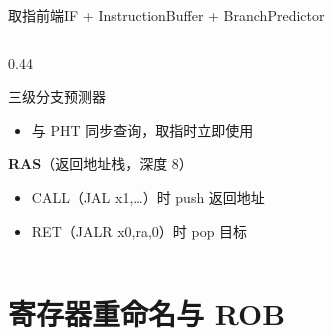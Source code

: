 \documentclass[aspectratio=169,xcolor={dvipsnames,svgnames},10pt]{beamer}
\begin{document}
\begin{frame}{取指前端}{IF + InstructionBuffer + BranchPredictor}
\begin{columns}[T]
\begin{column}{0.44\textwidth}
\begin{block}{三级分支预测器}
\begin{itemize}
          \item 与 PHT 同步查询，取指时立即使用
        \end{itemize}
        \vspace{0.1cm}
        \textbf{RAS}（返回地址栈，深度 8）
        \begin{itemize}
          \item CALL（JAL x1,…）时 push 返回地址
          \item RET（JALR x0,ra,0）时 pop 目标
        \end{itemize}
      \end{block}
    \end{column}
  \end{columns}
\end{frame}

\section{寄存器重命名与 ROB}
\end{document}

